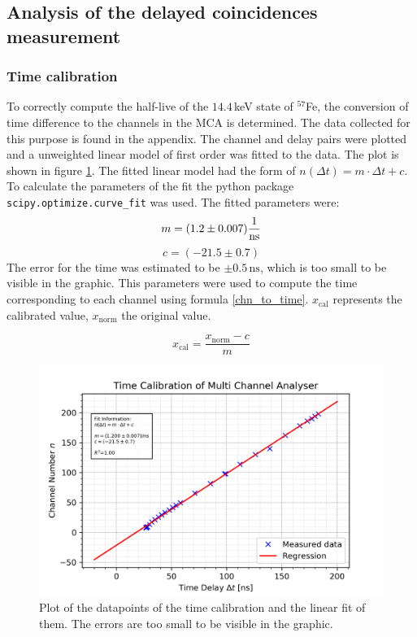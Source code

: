 \documentclass[30pt,a4paper]{article}
\begin{document}
 	\subsection{Analysis of the delayed coincidences measurement}
 	\subsubsection{Time calibration}
 	To correctly compute the half-live of the $14.4$\,keV state of $^{57}$Fe, the conversion of time difference to the channels in the MCA is determined. 
 	The data collected for this purpose is found in the appendix. 
 	The channel and delay pairs were plotted and a unweighted linear model of first
 	order was fitted to the data. The plot is shown in figure \ref{time_cal_plot}.
 	The fitted linear model had the form of $n(\Delta t) = m \cdot \Delta t + c$. To calculate the parameters of the fit the python package \verb|scipy.optimize.curve_fit|\cite{SciPy_Opti} was used.	The fitted parameters were:
 	$$
 	m = (1.2 \pm 0.007)\frac{1}{\textrm{ns}} \\$$$$
 	c = (-21.5 \pm 0.7)
 	$$
 	The error for the time was estimated to be $\pm 0.5\,\textrm{ns}$, which is too small
 	to be visible in the graphic.
 	This parameters were used to compute the time corresponding to each channel using 
 	formula \ref{chn_to_time}. $x_{\text{cal}}$ represents the calibrated value, $x_{\text{norm}}$ the original value.
 	
 	\begin{equation}
 	x_{\text{cal}} = \frac{x_{\text{norm}}-c}{m}
 	\label{chn_to_time}
 	\end{equation}
 	
 	\begin{figure}[h]
 		\includegraphics{Bilder/time_cal}
 		\centering
 		\caption[Time Calibration]{\small Plot of the datapoints of the time calibration and the linear fit of them. The errors are too small to be visible in the graphic.}
 		\label{time_cal_plot}
 	\end{figure}
 	
\end{document}
